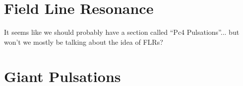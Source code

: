 





\section{Field Line Resonance}

It seems like we should probably have a section called ``Pc4 Pulsations''... but won't we mostly be talking about the idea of FLRs?

\section{Giant Pulsations}


%
%





